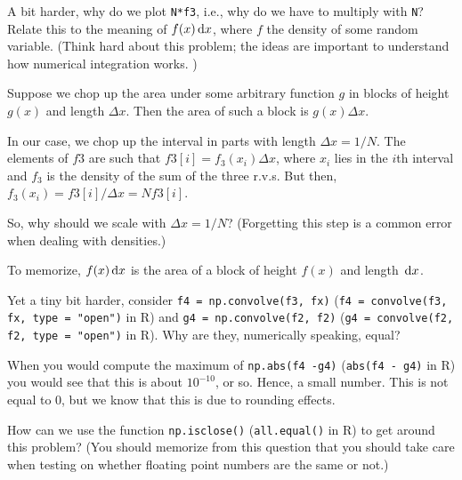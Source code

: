 \begin{exercise}
A bit harder, why do we plot \texttt{N*f3}, i.e., why do we have to multiply with \texttt{N}? Relate this to the meaning of $f(x)\,\textrm{d}x$, where $f$ the density of some random variable.
(Think hard about this problem; the ideas are important to understand how numerical integration works. )
\begin{hint}
  Suppose we chop up the area under some arbitrary  function $g$ in blocks of height $g(x)$ and length $\Delta x$.
  Then the area of such a block is $g(x) \Delta x$.


  In our case, we chop up the interval in parts with length $\Delta x = 1/N$.
  The elements of $f3$ are such that $f3[i] = f_{3}(x_{i}) \Delta x$, where $x_{i}$ lies in the $i$th interval and $f_{3}$ is the density of the sum of the three r.v.s. But then, $f_{3}(x_{i}) = f3[i]/\Delta x = N f3[i]$.

So, why should we  scale with $\Delta x = 1/N$? (Forgetting this step is a common error when dealing with densities.)

To memorize, $f(x) \,\textrm{d}x$ is the area of a block of height $f(x)$ and length $\,\textrm{d}x$.
\end{hint}
\end{exercise}

\begin{exercise}
Yet a tiny bit harder, consider \texttt{f4 = np.convolve(f3, fx)} (\texttt{f4 = convolve(f3, fx, type = "open")} in R) and \texttt{g4 = np.convolve(f2, f2)} (\texttt{g4 = convolve(f2, f2, type = "open")} in R). Why are they, numerically speaking,  equal?
\end{exercise}


\begin{exercise}
When you would compute the maximum of \texttt{np.abs(f4 -g4)} (\texttt{abs(f4 - g4)} in R) you would see that this is about $10^{-10}$, or so.
Hence, a small number.
This is not equal to 0, but we know that this is due to rounding effects.

How can we use the function \texttt{np.isclose()} (\texttt{all.equal()} in R) to get around this problem?
(You should memorize from this question that you should take care when testing on whether floating point numbers are the same or not.)
\end{exercise}
